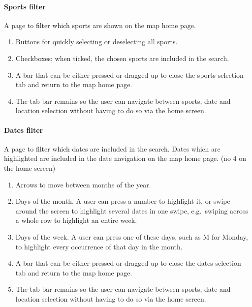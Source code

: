 \paragraph{Sports filter}

A page to filter which sports are shown on the map home page.

\begin{enumerate}
	\item Buttons for quickly selecting or deselecting all sports.
	\item Checkboxes; when ticked, the chosen sports are included in the
		search.
	\item A bar that can be either pressed or dragged up to close the sports
		selection tab and return to the map home page.
	\item The tab bar remains so the user can navigate between sports, date and
		location selection without having to do so via the home screen.
\end{enumerate}

\paragraph{Dates filter}

A page to filter which dates are included in the search. Dates which are
highlighted are included in the date navigation on the map home page. (no 4 on
the home screen)

\begin{enumerate}
	\item Arrows to move between months of the year.
	\item Days of the month. A user can press a number to highlight it, or
		swipe around the screen to highlight several dates in one swipe, e.g.\
		swiping across a whole row to highlight an entire week.
	\item Days of the week. A user can press one of these days, such as M for
		Monday, to highlight every occurrence of that day in the month.
	\item A bar that can be either pressed or dragged up to close the dates
		selection tab and return to the map home page.
	\item The tab bar remains so the user can navigate between sports, date and
		location selection without having to do so via the home screen.
\end{enumerate}


